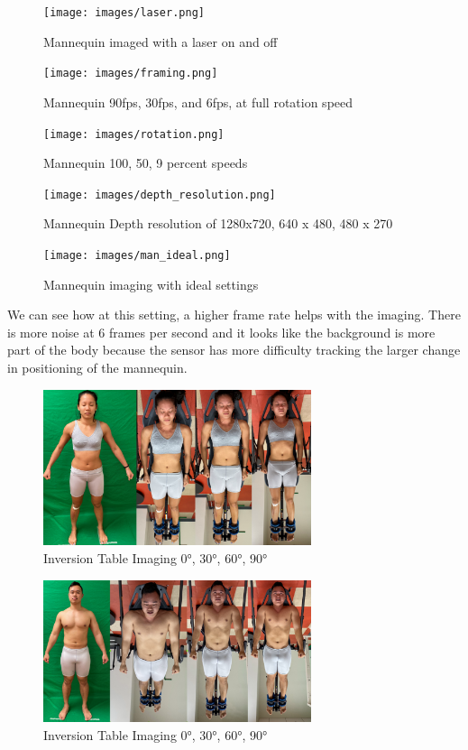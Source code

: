 \begin{figure}[!htb]
	\caption{Mannequin imaged with a laser on and off}
	\centering
	\texttt{[image: images/laser.png]}
\end{figure}


\begin{figure}[!htb]
	\caption{Mannequin 90fps, 30fps, and 6fps, at full rotation speed}
	\centering
	\texttt{[image: images/framing.png]}
\end{figure}


\begin{figure}[!htb]
	\caption{Mannequin 100, 50, 9 percent speeds}
	\centering
	\texttt{[image: images/rotation.png]}
\end{figure}

\begin{figure}[!htb]
	\caption{Mannequin Depth resolution of 1280x720, 640 x 480, 480 x 270}
	\centering
	\texttt{[image: images/depth\_resolution.png]}
\end{figure}


\begin{figure}[!htb]
	\caption{Mannequin imaging with ideal settings}
	\centering
	\texttt{[image: images/man\_ideal.png]}
\end{figure}



We can see how at this setting, a higher frame rate helps with the imaging. There is more noise at 6 frames per second and it looks like the background is more part of the body because the sensor has more difficulty tracking the larger change in positioning of the mannequin.
\begin{figure}[!htb]
	\caption{Inversion Table Imaging \ang{0}, \ang{30}, \ang{60}, \ang{90}}
	\centering
	\includegraphics[width=0.7\textwidth]{images/en_inversion.png}
\end{figure}



\begin{figure}[!htb]
	\caption{Inversion Table Imaging \ang{0}, \ang{30}, \ang{60}, \ang{90}}
	\centering
	\includegraphics[width=0.7\textwidth]{images/mw_inversion.png}
\end{figure}


